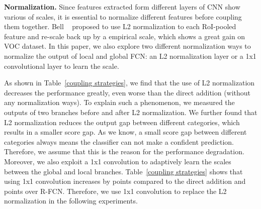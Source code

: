 \documentclass[10pt,twocolumn,letterpaper]{article}
\begin{document}
\textbf{Normalization.} Since features extracted form different layers of CNN show various of scales, it is essential to normalize different features before coupling them together. Bell \etal~\cite{bell16ion} proposed to use L2 normalization to each RoI-pooled feature and re-scale back up by a empirical scale, which shows a great gain on VOC dataset. In this paper, we also explore two different normalization ways to normalize the output of local and global FCN: an L2 normalization layer or a 1x1 convolutional layer to learn the scale.

As shown in Table~\ref{coupling strategies}, we find that the use of L2 normalization decreases the performance greatly, even worse than the direct addition (without any normalization ways). To explain such a phenomenon, we measured the outputs of two branches before and after L2 normalization. We further found that L2 normalization reduces the output gap between different categories, which results in a smaller score gap. As we know, a small score gap between different categories always means the classifier can not make a confident prediction. Therefore, we assume that this is the reason for the performance degradation. Moreover, we also exploit a 1x1 convolution to adaptively learn the scales between the global and local branches. Table~\ref{coupling strategies} shows that using 1x1 convolution increases by  points compared to the direct addition and  points over R-FCN. Therefore, we use 1x1 convolution to replace the L2 normalization in the following experiments.

\begin{table}[htbp]
\begin{center}
\end{center}
\caption{\textbf{Effects of different normalization operation and coupling methods.} Metric: detection mAP() on VOC07 test. eltwise: combine the output from global and local FCN directly. L2+eltwise: use L2 normalization to normalize the output. 1x1 conv+eltwise: use 1x1 convolution to learn the scale.}
\label{coupling strategies}
\end{table}
\end{document}

